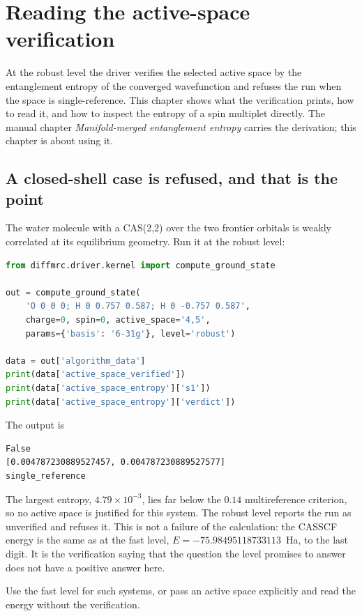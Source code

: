 \section{Reading the active-space verification}
\label{sec:manifold-tutorial}

At the robust level the driver verifies the selected active space by
the entanglement entropy of the converged wavefunction and refuses the
run when the space is single-reference.  This chapter shows what the
verification prints, how to read it, and how to inspect the entropy of
a spin multiplet directly.  The manual chapter
\emph{Manifold-merged entanglement entropy} carries the derivation; this
chapter is about using it.

\subsection{A closed-shell case is refused, and that is the point}

The water molecule with a CAS(2,2) over the two frontier orbitals is
weakly correlated at its equilibrium geometry.  Run it at the robust
level:
\begin{lstlisting}[language=Python]
from diffmrc.driver.kernel import compute_ground_state

out = compute_ground_state(
    'O 0 0 0; H 0 0.757 0.587; H 0 -0.757 0.587',
    charge=0, spin=0, active_space='4,5',
    params={'basis': '6-31g'}, level='robust')

data = out['algorithm_data']
print(data['active_space_verified'])
print(data['active_space_entropy']['s1'])
print(data['active_space_entropy']['verdict'])
\end{lstlisting}
The output is
\begin{lstlisting}
False
[0.004787230889527457, 0.004787230889527577]
single_reference
\end{lstlisting}
The largest entropy, $4.79\times10^{-3}$, lies far below the $0.14$
multireference criterion, so no active space is justified for this
system.  The robust level reports the run as unverified and refuses it.
This is not a failure of the calculation: the CASSCF energy is the same
as at the fast level, $E=-75.98495118733113$~Ha, to the last digit.  It
is the verification saying that the question the level promises to
answer does not have a positive answer here.

Use the fast level for such systems, or pass an active space
explicitly and read the energy without the verification.

